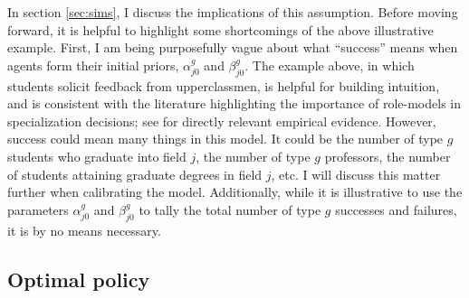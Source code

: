 \documentclass[10 pt]{article}
\newcommand{\toedit}[1]{{\color{gray}#1}}
\newcommand{\toedit}[1]{#1}
\newcommand{\footnts}[1]{\nts{\footnote{\nts{#1}}}}
\newcommand{\footnts}[1]{}
\begin{document}
In section \ref{sec:sims}, I discuss the implications of this assumption.
Before moving forward, it is helpful to highlight some shortcomings of the above illustrative example.
First, I am being purposefully vague about what ``success'' means when agents form their initial priors, $\alpha_{j0}^g$ and $\beta_{j0}^g$.
The example above, in which students solicit feedback from upperclassmen, is helpful for building intuition, and is consistent with the literature highlighting the importance of role-models in specialization decisions; see \textcite{PS20} for directly relevant empirical evidence.
However, success could mean many things in this model. 
It could be the number of type $g$ students who graduate into field $j$, the number of type $g$ professors, the number of students attaining graduate degrees in field $j$, etc. 
I will discuss this matter further when calibrating the model.\footnts{Make sure I do this!}
\toedit{Additionally, while it is illustrative to use the parameters $\alpha_{j0}^g$ and $\beta_{j0}^g$ to tally the total number of type $g$ successes and failures, it is by no means necessary.}


\subsection{Optimal policy}\label{sec:optimal_policy}
\end{document}
